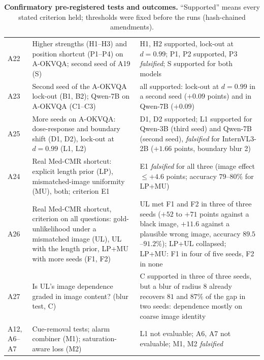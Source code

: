 \begin{table}[t]
\begin{tabular}{@{}l p{} p{}@{}}
    A22 & Higher strengths (H1--H3) and position shortcut (P1--P4) on A-OKVQA; second seed of A19 (S) & H1, H2 supported, lock-out at $d=0.99$; P1, P2 supported, P3 \emph{falsified}; S supported for both models \\
    A23 & Second seed of the A-OKVQA lock-out (B1, B2); Qwen-7B on A-OKVQA (C1--C3) & all supported: lock-out at $d=0.99$ in a second seed ($+0.09$ points) and in Qwen-7B ($+0.09$) \\
    A25 & More seeds on A-OKVQA: dose-response and boundary shift (D1, D2), lock-out at $d=0.99$ (L1, L2) & D1, D2 supported; L1 supported for Qwen-3B (third seed) and Qwen-7B (second seed), \emph{falsified} for InternVL3-2B ($+1.66$ points, boundary blur 2) \\
    A24 & Real Med-CMR shortcut: explicit length prior (LP), mismatched-image uniformity (MU), both; criterion E1 & E1 \emph{falsified} for all three (image effect $\le+4.6$ points; accuracy $79$--$80\%$ for LP+MU) \\
    A26 & Real Med-CMR shortcut, criterion on all questions: gold-unlikelihood under a mismatched image (UL), UL with the length prior, LP+MU with more seeds (F1, F2) & UL met F1 and F2 in three of three seeds ($+52$ to $+71$ points against a black image, $+11.6$ against a plausible wrong image, accuracy $89.5$--$91.2\%$); LP+UL collapsed; LP+MU: F1 in four of five seeds, F2 in none \\
    A27 & Is UL's image dependence graded in image content? (blur test, C) & C supported in three of three seeds, but a blur of radius 8 already recovers $81$ and $87\%$ of the gap in two seeds: dependence mostly on coarse image identity \\
    A12, A6--A7 & Cue-removal tests; alarm combiner (M1); saturation-aware loss (M2) & L1 not evaluable; A6, A7 not evaluable; M1, M2 \emph{falsified} \\
    \bottomrule
  \end{tabular}
  \caption{\textbf{Confirmatory pre-registered tests and outcomes.} ``Supported'' means every stated criterion held; thresholds were fixed before the runs (hash-chained amendments).}
  \label{tab:prereg}
\end{table}
